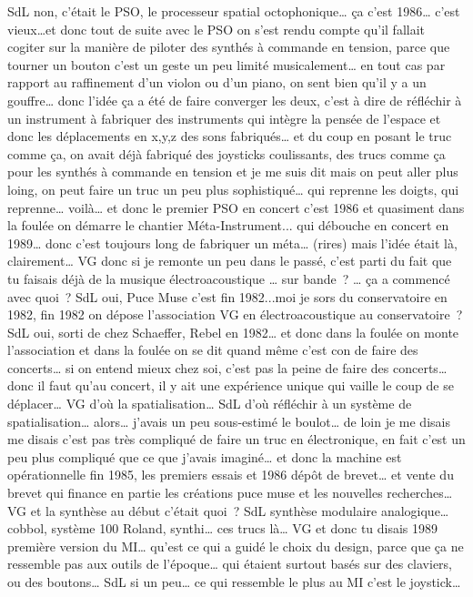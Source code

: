 SdL non, c'était le PSO, le processeur spatial octophonique… ça c'est 1986… c'est vieux…et donc tout de suite avec le PSO on s'est rendu compte qu'il fallait cogiter sur la manière de piloter des synthés à commande en tension, parce que tourner un bouton c'est un geste un peu limité musicalement… en tout cas par rapport au raffinement d'un violon ou d'un piano, on sent bien qu'il y a un gouffre… donc l'idée ça a été de faire converger les deux, c'est à dire de réfléchir à un instrument à fabriquer des instruments qui intègre la pensée de l'espace et donc les déplacements en x,y,z des sons fabriqués… et du coup en posant le truc comme ça, on avait déjà fabriqué des joysticks coulissants, des trucs comme ça pour les synthés à commande en tension et je me suis dit mais on peut aller plus loing, on peut faire un truc un peu plus sophistiqué… qui reprenne les doigts, qui reprenne… voilà… et donc le premier PSO en concert c'est 1986 et quasiment dans la foulée on démarre le chantier Méta-Instrument... qui débouche en concert en 1989… donc c'est toujours long de fabriquer un méta… (rires) mais l'idée était là, clairement… 
VG donc si je remonte un peu dans le passé, c'est parti du fait que tu faisais déjà de la musique électroacoustique … sur bande ? … ça a commencé avec quoi ? 
SdL oui, Puce Muse c'est fin 1982...moi je sors du conservatoire en 1982, fin 1982 on dépose l'association 
VG en électroacoustique au conservatoire ? 
SdL oui, sorti de chez Schaeffer, Rebel en 1982… et donc dans la foulée on monte l'association et dans la foulée on se dit quand même c'est con de faire des concerts… si on entend mieux chez soi, c'est pas la peine de faire des concerts… donc il faut qu'au concert, il y ait une expérience unique qui vaille le coup de se déplacer… 
VG d'où la spatialisation… 
SdL d'où réfléchir à un système de spatialisation… alors… j'avais un peu sous-estimé le boulot… de loin je me disais  me disais c'est pas très compliqué de faire un truc en électronique, en fait c'est un peu plus compliqué que ce que j'avais imaginé… et donc la machine est opérationnelle fin 1985, les premiers essais et 1986 dépôt de brevet… et vente du brevet qui finance en partie les créations puce muse et les nouvelles recherches…  
VG et la synthèse au début c'était quoi ? 
SdL synthèse modulaire analogique… cobbol, système 100 Roland, synthi… ces trucs là… 
VG et donc tu disais 1989 première version du MI… qu'est ce qui a guidé le choix du design, parce que ça ne ressemble pas aux outils de l'époque… qui étaient surtout basés sur des claviers, ou des boutons… 
SdL si un peu… ce qui ressemble le plus au MI c'est le joystick… 
